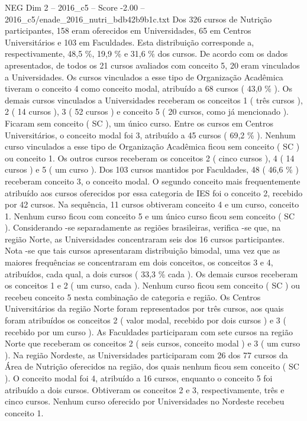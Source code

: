 \begin{textsample}{NEG Dim 2 – 2016\_c5 – Score -2.00 – 2016\_c5/enade\_2016\_nutri\_bdb42b9b1c.txt}
Dos 326 cursos de Nutrição participantes, 158 eram oferecidos em Universidades, 65 em Centros Universitários e 103 em Faculdades.
Esta distribuição corresponde a, respectivamente, 48,5 \%, 19,9 \% e 31,6 \% dos cursos.
De acordo com os dados apresentados, de todos os 21 cursos avaliados com conceito 5, 20 eram vinculados a Universidades.
Os cursos vinculados a esse tipo de Organização Acadêmica tiveram o conceito 4 como conceito modal, atribuído a 68 cursos ( 43,0 \% ).
Os demais cursos vinculados a Universidades receberam os conceitos 1 ( três cursos ), 2 ( 14 cursos ), 3 ( 52 cursos ) e conceito 5 ( 20 cursos, como já mencionado ).
Ficaram sem conceito ( SC ), um único curso.
Entre os cursos em Centros Universitários, o conceito modal foi 3, atribuído a 45 cursos ( 69,2 \% ).
Nenhum curso vinculados a esse tipo de Organização Acadêmica ficou sem conceito ( SC ) ou conceito 1.
Os outros cursos receberam os conceitos 2 ( cinco cursos ), 4 ( 14 cursos ) e 5 ( um curso ).
Dos 103 cursos mantidos por Faculdades, 48 ( 46,6 \% ) receberam conceito 3, o conceito modal.
O segundo conceito mais frequentemente atribuído aos cursos oferecidos por essa categoria de IES foi o conceito 2, recebido por 42 cursos.
Na sequência, 11 cursos obtiveram conceito 4 e um curso, conceito 1.
Nenhum curso ficou com conceito 5 e um único curso ficou sem conceito ( SC ).
Considerando -se separadamente as regiões brasileiras, verifica -se que, na região Norte, as Universidades concentraram seis dos 16 cursos participantes.
Nota -se que tais cursos apresentaram distribuição bimodal, uma vez que as maiores frequências se concentraram em dois conceitos, os conceitos 3 e 4, atribuídos, cada qual, a dois cursos ( 33,3 \% cada ).
Os demais cursos receberam os conceitos 1 e 2 ( um curso, cada ).
Nenhum curso ficou sem conceito ( SC ) ou recebeu conceito 5 nesta combinação de categoria e região.
Os Centros Universitários da região Norte foram representados por três cursos, aos quais foram atribuídos os conceitos 2 ( valor modal, recebido por dois cursos ) e 3 ( recebido por um curso ).
As Faculdades participaram com sete cursos na região Norte que receberam os conceitos 2 ( seis cursos, conceito modal ) e 3 ( um curso ).
Na região Nordeste, as Universidades participaram com 26 dos 77 cursos da Área de Nutrição oferecidos na região, dos quais nenhum ficou sem conceito ( SC ).
O conceito modal foi 4, atribuído a 16 cursos, enquanto o conceito 5 foi atribuído a dois cursos.
Obtiveram os conceitos 2 e 3, respectivamente, três e cinco cursos.
Nenhum curso oferecido por Universidades no Nordeste recebeu conceito 1.

\end{textsample}
